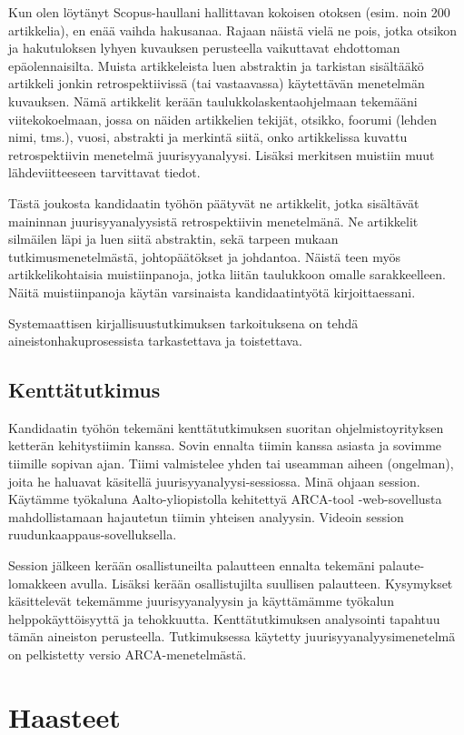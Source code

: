 \documentclass[12pt,a4paper,finnish,oneside]{article}
\begin{document}
Kun olen löytänyt Scopus-haullani hallittavan kokoisen otoksen (esim. noin 200 artikkelia), en enää vaihda hakusanaa. Rajaan näistä vielä ne pois, jotka otsikon ja hakutuloksen lyhyen kuvauksen perusteella vaikuttavat ehdottoman epäolennaisilta. Muista artikkeleista luen abstraktin ja tarkistan sisältääkö artikkeli jonkin retrospektiivissä (tai vastaavassa) käytettävän menetelmän kuvauksen. Nämä artikkelit kerään taulukkolaskentaohjelmaan tekemääni viitekokoelmaan, jossa on näiden artikkelien tekijät, otsikko, foorumi (lehden nimi, tms.), vuosi, abstrakti ja merkintä siitä, onko artikkelissa kuvattu retrospektiivin menetelmä juurisyyanalyysi. Lisäksi merkitsen muistiin muut lähdeviitteeseen tarvittavat tiedot.

Tästä joukosta kandidaatin työhön päätyvät ne artikkelit, jotka sisältävät maininnan juurisyyanalyysistä retrospektiivin menetelmänä. Ne artikkelit silmäilen läpi ja luen siitä abstraktin, sekä tarpeen mukaan tutkimusmenetelmästä, johtopäätökset ja johdantoa. Näistä teen myös artikkelikohtaisia muistiinpanoja, jotka liitän taulukkoon omalle sarakkeelleen. Näitä muistiinpanoja käytän varsinaista kandidaatintyötä kirjoittaessani.

Systemaattisen kirjallisuustutkimuksen tarkoituksena on tehdä aineistonhakuprosessista tarkastettava ja toistettava.

\subsection{Kenttätutkimus}
Kandidaatin työhön tekemäni kenttätutkimuksen suoritan ohjelmistoyrityksen ketterän kehitystiimin kanssa. Sovin ennalta tiimin kanssa asiasta ja sovimme tiimille sopivan ajan. Tiimi valmistelee yhden tai useamman aiheen (ongelman), joita he haluavat käsitellä juurisyyanalyysi-sessiossa. Minä ohjaan session. Käytämme työkaluna Aalto-yliopistolla kehitettyä ARCA-tool -web-sovellusta mahdollistamaan hajautetun tiimin yhteisen analyysin. Videoin session ruudunkaappaus-sovelluksella. 

Session jälkeen kerään osallistuneilta palautteen ennalta tekemäni palaute-lomakkeen avulla. Lisäksi kerään osallistujilta suullisen palautteen. Kysymykset käsittelevät tekemämme juurisyyanalyysin ja käyttämämme työkalun helppokäyttöisyyttä ja tehokkuutta. Kenttätutkimuksen analysointi tapahtuu tämän aineiston perusteella. Tutkimuksessa käytetty juurisyyanalyysimenetelmä on pelkistetty versio ARCA-menetelmästä.

\section{Haasteet}
\end{document}
